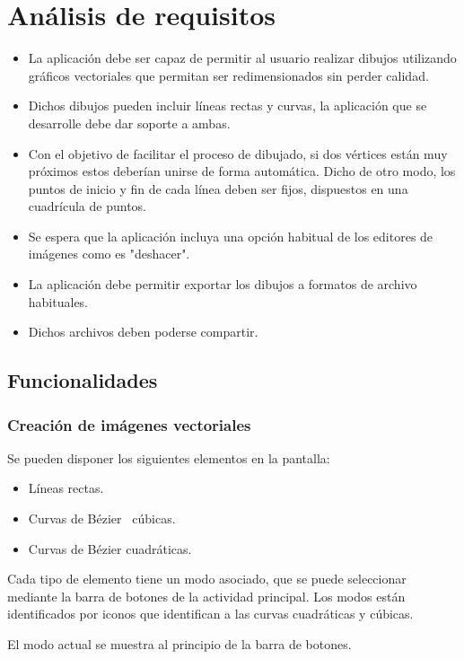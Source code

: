 \documentclass[a4paper,openright,12pt]{article}
\begin{document}
\section{Análisis de requisitos}
\begin{itemize}
    \item La aplicación debe ser capaz de permitir al usuario realizar dibujos utilizando gráficos vectoriales que permitan ser redimensionados sin perder calidad.
    \item Dichos dibujos pueden incluir líneas rectas y curvas, la aplicación que se desarrolle debe dar soporte a ambas.
    \item Con el objetivo de facilitar el proceso de dibujado, si dos vértices están muy próximos estos deberían unirse de forma automática. Dicho de otro modo, los puntos de inicio y fin de cada línea deben ser fijos, dispuestos en una cuadrícula de puntos.
    \item Se espera que la aplicación incluya una opción habitual de los editores de imágenes como es "deshacer".
    \item La aplicación debe permitir exportar los dibujos a formatos de archivo habituales.
    \item Dichos archivos deben poderse compartir.
\end{itemize}

\subsection{Funcionalidades}
\subsubsection{Creación de imágenes vectoriales}
Se pueden disponer los siguientes elementos en la pantalla:
\begin{itemize}
	\item Líneas rectas.
	\item Curvas de Bézier~\cite{Curvas_de_Bezier} cúbicas.
	\item Curvas de Bézier cuadráticas.
\end{itemize}

Cada tipo de elemento tiene un modo asociado, que se puede seleccionar mediante la barra de botones de la actividad principal.
Los modos están identificados por iconos que identifican a las curvas cuadráticas y cúbicas.

El modo actual se muestra al principio de la barra de botones.
\end{document}
